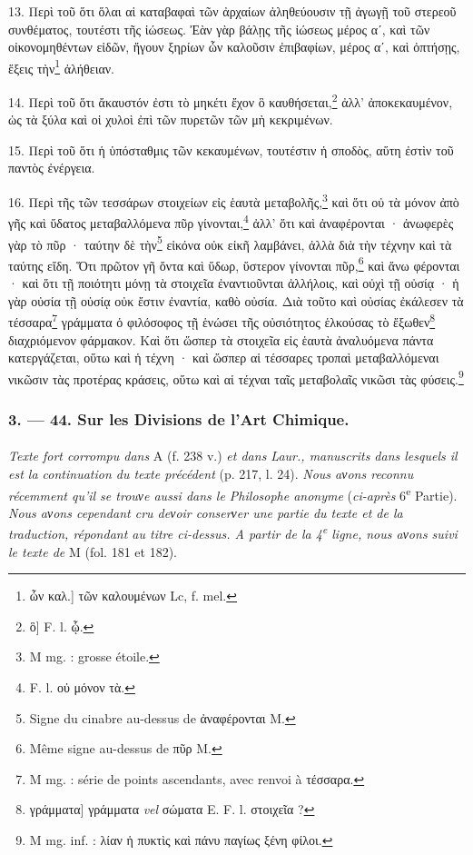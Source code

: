 \documentclass[landscape, a4paper, 11pt, oneside, polutonikogreek, french]{article}
\begin{document}
13. Περὶ τοῦ ὅτι ὅλαι αἱ καταβαφαὶ τῶν ἀρχαίων ἀληθεύουσιν τῇ ἀγωγῇ τοῦ στερεοῦ συνθέματος, τουτέστι τῆς ἰώσεως. Ἐὰν γὰρ βάλῃς τῆς ἰώσεως μέρος αʹ, καὶ τῶν οἰκονομηθέντων εἰδῶν, ἤγουν ξηρίων ὧν καλοῦσιν ἐπιβαφίων, μέρος αʹ, καὶ ὀπτήσῃς, ἕξεις τὴν\footnote{ὧν καλ.] τῶν καλουμένων Lc, f. mel.} ἀλήθειαν.

14. Περὶ τοῦ ὅτι ἄκαυστόν ἐστι τὸ μηκέτι ἔχον ὃ καυθήσεται,\footnote{ὃ] F. l. ᾧ.} ἀλλ' ἀποκεκαυμένον, ὡς τὰ ξύλα καὶ οἱ χυλοὶ ἐπὶ τῶν πυρετῶν τῶν μὴ κεκριμένων.

15. Περὶ τοῦ ὅτι ἡ ὑπόσταθμις τῶν κεκαυμένων, τουτέστιν ἡ σποδὸς, αὕτη ἐστὶν τοῦ παντὸς ἐνέργεια.

16. Περὶ τῆς τῶν τεσσάρων στοιχείων εἰς ἑαυτὰ μεταβολῆς,\footnote{M mg. : grosse étoile.} καὶ ὅτι οὐ τὰ μόνον ἀπὸ γῆς καὶ ὕδατος μεταβαλλόμενα πῦρ γίνονται,\footnote{F. l. οὐ μόνον τὰ.} ἀλλ' ὅτι καὶ ἀναφέρονται · ἀνωφερὲς γὰρ τὸ πῦρ · ταύτην δὲ τὴν\footnote{Signe du cinabre au-dessus de ἀναφέρονται M.} εἰκόνα οὐκ εἰκῆ λαμβάνει, ἀλλὰ διὰ τὴν τέχνην καὶ τὰ ταύτης εἴδη. Ὅτι πρῶτον γῆ ὄντα καὶ ὕδωρ, ὕστερον γίνονται πῦρ,\footnote{Même signe au-dessus de πῦρ M.} καὶ ἄνω φέρονται · καὶ ὅτι τῇ ποιότητι μόνῃ τὰ στοιχεῖα ἐναντιοῦνται ἀλλήλοις, καὶ οὐχὶ τῇ οὐσίᾳ · ἡ γὰρ οὐσία τῇ οὐσίᾳ οὐκ ἔστιν ἐναντία, καθὸ οὐσία. Διὰ τοῦτο καὶ οὐσίας ἐκάλεσεν τὰ τέσσαρα\footnote{M mg. : série de points ascendants, avec renvoi à τέσσαρα.} γράμματα ὁ φιλόσοφος τῇ ἑνώσει τῆς οὐσιότητος ἑλκούσας τὸ ἔξωθεν\footnote{γράμματα] γράμματα \emph{vel} σώματα E. F. l. στοιχεῖα ?} διαχριόμενον φάρμακον. Καὶ ὅτι ὥσπερ τὰ στοιχεῖα εἰς ἑαυτὰ ἀναλυόμενα πάντα κατεργάζεται, οὕτω καὶ ἡ τέχνη · καὶ ὥσπερ αἱ τέσσαρες τροπαὶ μεταβαλλόμεναι νικῶσιν τὰς προτέρας κράσεις, οὕτω καὶ αἱ τέχναι ταῖς μεταβολαῖς νικῶσι τὰς φύσεις.\footnote{M mg. inf. : λίαν ἡ πυκτὶς καὶ πάνυ παγίως ξένη φίλοι.}

\bigskip
\centerline{\EightStarTaper}
\centerline{\EightStarTaper\EightStarTaper}
\bigskip

\subsubsection{3. --- 44. Sur les Divisions de l'Art Chimique.}
\paragraph{}
\emph{Texte fort corrompu dans} A (f. 238 v.) \emph{et dans Laur., manuscrits dans lesquels il est la continuation du texte précédent} (p. 217, l. 24). \emph{Nous aνons reconnu récemment qu'il se trouνe aussi dans le Philosophe anonyme} (\emph{ci-après} 6\textsuperscript{e} Partie). \emph{Nous aνons cependant cru deνoir conserνer une partie du texte et de la traduction, répondant au titre ci-dessus. A partir de la 4\textsuperscript{e} ligne, nous aνons suivi le texte de} M (fol. 181 et 182).
\end{document}
